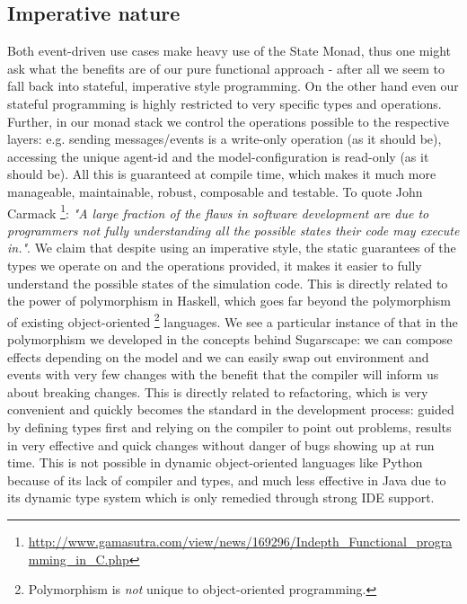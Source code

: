 \subsection{Imperative nature}
Both event-driven use cases make heavy use of the State Monad, thus one might ask what the benefits are of our pure functional approach - after all we seem to fall back into stateful, imperative style programming. %
On the other hand even our stateful programming is highly restricted to very specific types and operations. Further, in our monad stack we control the operations possible to the respective layers: e.g. sending messages/events is a write-only operation (as it should be), accessing the unique agent-id and the model-configuration is read-only (as it should be). All this is guaranteed at compile time, which makes it much more manageable, maintainable, robust, composable and testable.
To quote John Carmack \footnote{\url{http://www.gamasutra.com/view/news/169296/Indepth_Functional_programming_in_C.php}}: \emph{"A large fraction of the flaws in software development are due to programmers not fully understanding all the possible states their code may execute in."}. We claim that despite using an imperative style, the static guarantees of the types we operate on and the operations provided, it makes it easier to fully understand the possible states of the simulation code.
This is directly related to the power of polymorphism in Haskell, which goes far beyond the polymorphism of existing object-oriented \footnote{Polymorphism is \textit{not} unique to object-oriented programming.} languages. We see a particular instance of that in the polymorphism we developed in the concepts behind Sugarscape: we can compose effects depending on the model and we can easily swap out environment and events with very few changes with the benefit that the compiler will inform us about breaking changes. This is directly related to refactoring, which is very convenient and quickly becomes the standard in the development process: guided by defining types first and relying on the compiler to point out problems, results in very effective and quick changes without danger of bugs showing up at run time. This is not possible in dynamic object-oriented languages like Python because of its lack of compiler and types, and much less effective in Java due to its dynamic type system which is only remedied through strong IDE support.

